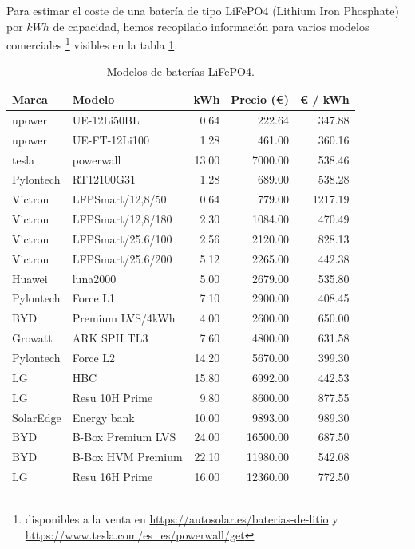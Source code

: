 Para estimar el coste de una batería de tipo LiFePO4 (Lithium Iron Phosphate)
por $kWh$ de capacidad, hemos recopilado información para varios modelos
comerciales \footnote{disponibles a la venta en
	\url{https://autosolar.es/baterias-de-litio} y
	\url{https://www.tesla.com/es_es/powerwall/get}} visibles en la tabla
\ref{tab:batteries_data}.

\begin{table}[htbp]
	\centering
	\begin{tabular}{llrrr}
		\toprule
		Marca     & Modelo            & kWh   & Precio (€) & € / kWh \\
		\midrule
		upower    & UE-12Li50BL       & 0.64  & 222.64     & 347.88  \\
		upower    & UE-FT-12Li100     & 1.28  & 461.00     & 360.16  \\
		tesla     & powerwall         & 13.00 & 7000.00    & 538.46  \\
		Pylontech & RT12100G31        & 1.28  & 689.00     & 538.28  \\
		Victron   & LFPSmart/12,8/50  & 0.64  & 779.00     & 1217.19 \\
		Victron   & LFPSmart/12,8/180 & 2.30  & 1084.00    & 470.49  \\
		Victron   & LFPSmart/25.6/100 & 2.56  & 2120.00    & 828.13  \\
		Victron   & LFPSmart/25.6/200 & 5.12  & 2265.00    & 442.38  \\
		Huawei    & luna2000          & 5.00  & 2679.00    & 535.80  \\
		Pylontech & Force L1          & 7.10  & 2900.00    & 408.45  \\
		BYD       & Premium LVS/4kWh  & 4.00  & 2600.00    & 650.00  \\
		Growatt   & ARK SPH TL3       & 7.60  & 4800.00    & 631.58  \\
		Pylontech & Force L2          & 14.20 & 5670.00    & 399.30  \\
		LG        & HBC               & 15.80 & 6992.00    & 442.53  \\
		LG        & Resu 10H Prime    & 9.80  & 8600.00    & 877.55  \\
		SolarEdge & Energy bank       & 10.00 & 9893.00    & 989.30  \\
		BYD       & B-Box Premium LVS & 24.00 & 16500.00   & 687.50  \\
		BYD       & B-Box HVM Premium & 22.10 & 11980.00   & 542.08  \\
		LG        & Resu 16H Prime    & 16.00 & 12360.00   & 772.50  \\
		\bottomrule
	\end{tabular}
	\caption{Modelos de baterías LiFePO4.}
	\label{tab:batteries_data}
\end{table}

